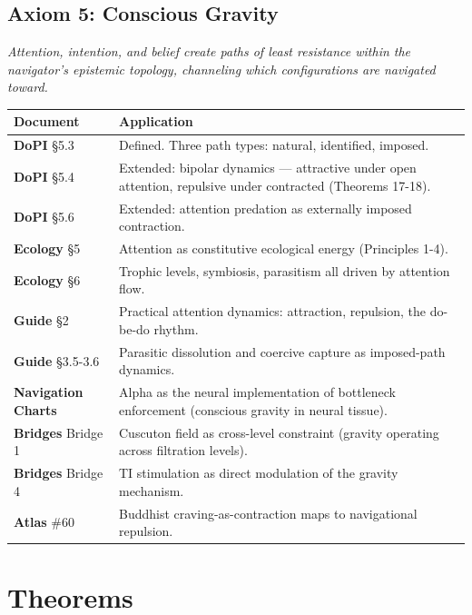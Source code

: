 \subsection*{Axiom 5: Conscious Gravity}


\textit{Attention, intention, and belief create paths of least resistance within the navigator's epistemic topology, channeling which configurations are navigated toward.}



\begin{longtable}{p{} p{}}
\toprule
\textbf{Document} & \textbf{Application} \\
\midrule
\endhead
\textbf{DoPI} §5.3 & Defined. Three path types: natural, identified, imposed. \\
\textbf{DoPI} §5.4 & Extended: bipolar dynamics — attractive under open attention, repulsive under contracted (Theorems 17-18). \\
\textbf{DoPI} §5.6 & Extended: attention predation as externally imposed contraction. \\
\textbf{Ecology} §5 & Attention as constitutive ecological energy (Principles 1-4). \\
\textbf{Ecology} §6 & Trophic levels, symbiosis, parasitism all driven by attention flow. \\
\textbf{Guide} §2 & Practical attention dynamics: attraction, repulsion, the do-be-do rhythm. \\
\textbf{Guide} §3.5-3.6 & Parasitic dissolution and coercive capture as imposed-path dynamics. \\
\textbf{Navigation Charts} & Alpha as the neural implementation of bottleneck enforcement (conscious gravity in neural tissue). \\
\textbf{Bridges} Bridge 1 & Cuscuton field as cross-level constraint (gravity operating across filtration levels). \\
\textbf{Bridges} Bridge 4 & TI stimulation as direct modulation of the gravity mechanism. \\
\textbf{Atlas} \#60 & Buddhist craving-as-contraction maps to navigational repulsion. \\
\bottomrule
\end{longtable}



\bigskip\noindent\makebox[\textwidth]{\color{rulegray}\rule{5cm}{0.3pt}}\bigskip


\section*{Theorems}


